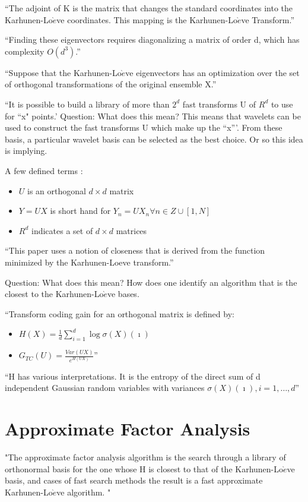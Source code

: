 \documentclass[11pt]{book}
\begin{document}
``The adjoint of K is the matrix that changes the standard coordinates into the Karhunen-Lo$\grave{e}$ve coordinates.  This mapping is the Karhunen-Lo$\grave{e}$ve Transform.''

``Finding these eigenvectors requires diagonalizing a matrix of order d, which has complexity $O(d^3)$.''

``Suppose that the Karhunen-Lo$\grave{e}$ve eigenvectors has an optimization over the set of orthogonal transformations of the original ensemble X.''

 ``It is possible to build a library of more than $2^d$ fast transforms U of $R^d$ to use for ``x" points.'
Question:  What does this mean?  
 This means that wavelets can be used to construct the fast transforms U which make up the ``x'''.  From these basis, a particular wavelet basis can be selected as the best choice.  Or so this idea is implying.
 

A few defined terms :
\begin{itemize}
\item $U$ is an orthogonal $d\times d$ matrix
\item $Y=UX$ is short hand for $Y_n = UX_n \forall n \in Z \cup [1,N]$
\item $R^d$ indicates a set of $d \times d$ matrices
\end{itemize}



``This paper uses a notion of closeness that is derived from the function minimized by the Karhunen-Loeve transform.''

Question:  What does this mean?  How does one identify an algorithm that is the closest to the Karhunen-Lo$\grave{e}$ve bases.  

``Transform coding gain for an orthogonal matrix is defined by:
\begin{itemize}
\item $H(X) = \frac{1}{d} \sum\limits^d_{i=1} \log \sigma (X)(\imath) $
\item $G_{TC} (U) = \frac {Var(UX)}{e^{H(UX)}} $''
\end{itemize}

``H has various interpretations.  It is the entropy of the direct sum of d independent Gaussian random variables with variances $\sigma(X)(\imath), i=1,\ldots,d$''

\section{Approximate Factor Analysis}
"The approximate factor analysis algorithm is the search through a library of orthonormal basis for the one whose H is closest to that of the Karhunen-Lo$\grave{e}$ve basis, and cases of fast search methods the result is a fast approximate Karhunen-Lo$\grave{e}$ve algorithm.  "
\end{document}
